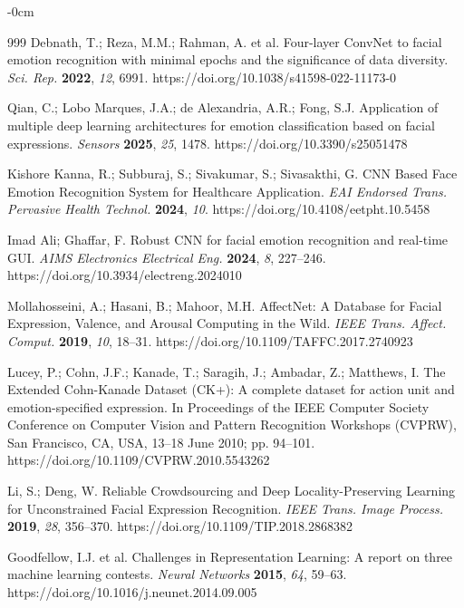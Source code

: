 \documentclass[journal,article,submit,pdftex,moreauthors]{Definitions/mdpi}
\begin{document}
\begin{adjustwidth}{-\extralength}{0cm}
\begin{thebibliography}{999}
		Debnath, T.; Reza, M.M.; Rahman, A. et al. Four-layer ConvNet to facial emotion recognition with minimal epochs and the significance of data diversity. {\em Sci. Rep.} {\bf 2022}, {\em 12}, 6991. https://doi.org/10.1038/s41598-022-11173-0
		
		Qian, C.; Lobo Marques, J.A.; de Alexandria, A.R.; Fong, S.J. Application of multiple deep learning architectures for emotion classification based on facial expressions. {\em Sensors} {\bf 2025}, {\em 25}, 1478. https://doi.org/10.3390/s25051478
		
		Kishore Kanna, R.; Subburaj, S.; Sivakumar, S.; Sivasakthi, G. CNN Based Face Emotion Recognition System for Healthcare Application. {\em EAI Endorsed Trans. Pervasive Health Technol.} {\bf 2024}, {\em 10}. https://doi.org/10.4108/eetpht.10.5458
		
		Imad Ali; Ghaffar, F. Robust CNN for facial emotion recognition and real-time GUI. {\em AIMS Electronics Electrical Eng.} {\bf 2024}, {\em 8}, 227--246. https://doi.org/10.3934/electreng.2024010
		
		Mollahosseini, A.; Hasani, B.; Mahoor, M.H. AffectNet: A Database for Facial Expression, Valence, and Arousal Computing in the Wild. {\em IEEE Trans. Affect. Comput.} {\bf 2019}, {\em 10}, 18--31. https://doi.org/10.1109/TAFFC.2017.2740923
		
		Lucey, P.; Cohn, J.F.; Kanade, T.; Saragih, J.; Ambadar, Z.; Matthews, I. The Extended Cohn-Kanade Dataset (CK+): A complete dataset for action unit and emotion-specified expression. In Proceedings of the IEEE Computer Society Conference on Computer Vision and Pattern Recognition Workshops (CVPRW), San Francisco, CA, USA, 13--18 June 2010; pp. 94--101. https://doi.org/10.1109/CVPRW.2010.5543262
		
		Li, S.; Deng, W. Reliable Crowdsourcing and Deep Locality-Preserving Learning for Unconstrained Facial Expression Recognition. {\em IEEE Trans. Image Process.} {\bf 2019}, {\em 28}, 356--370. https://doi.org/10.1109/TIP.2018.2868382
		
		Goodfellow, I.J. et al. Challenges in Representation Learning: A report on three machine learning contests. {\em Neural Networks} {\bf 2015}, {\em 64}, 59--63. https://doi.org/10.1016/j.neunet.2014.09.005
		

\end{thebibliography}
\end{adjustwidth}
\end{document}
